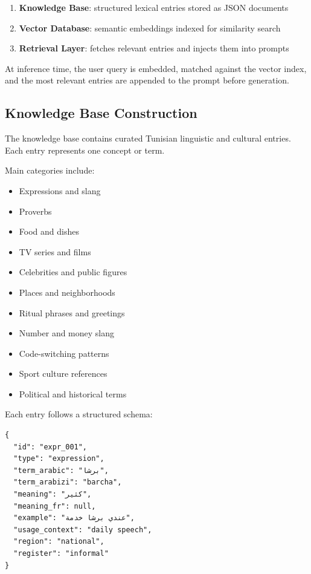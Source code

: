 \documentclass[12pt,a4paper]{report}
\begin{document}
\begin{enumerate}
    \item \textbf{Knowledge Base}: structured lexical entries stored as JSON documents
    \item \textbf{Vector Database}: semantic embeddings indexed for similarity search
    \item \textbf{Retrieval Layer}: fetches relevant entries and injects them into prompts
\end{enumerate}

At inference time, the user query is embedded, matched against the vector index,
and the most relevant entries are appended to the prompt before generation.

\subsection{Knowledge Base Construction}

The knowledge base contains curated Tunisian linguistic and cultural entries.
Each entry represents one concept or term.

Main categories include:

\begin{itemize}
    \item Expressions and slang
    \item Proverbs
    \item Food and dishes
    \item TV series and films
    \item Celebrities and public figures
    \item Places and neighborhoods
    \item Ritual phrases and greetings
    \item Number and money slang
    \item Code-switching patterns
    \item Sport culture references
    \item Political and historical terms
\end{itemize}

Each entry follows a structured schema:

\begin{verbatim}
{
  "id": "expr_001",
  "type": "expression",
  "term_arabic": "برشا",
  "term_arabizi": "barcha",
  "meaning": "كثير",
  "meaning_fr": null,
  "example": "عندي برشا خدمة",
  "usage_context": "daily speech",
  "region": "national",
  "register": "informal"
}
\end{verbatim}
\end{document}
